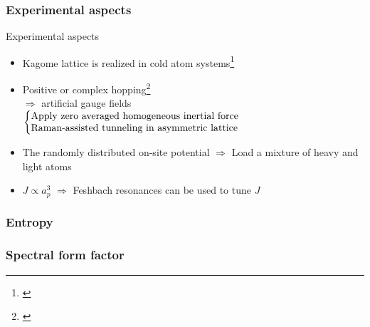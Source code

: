 \subsubsection{Experimental aspects}
\begin{frame}{Experimental aspects}

\begin{itemize}
\item Kagome lattice is realized in cold atom systems\footnote[frame]{\cite{jo2012ultracold}}
\vspace{3 mm}

\item Positive or complex hopping\footnote[frame]{\cite{aidelsburger2011experimental,struck2012tunable}}\\
\vspace{3 mm} $\Rightarrow$ artificial gauge fields
$\left\lbrace\parbox{8cm}{
Apply zero averaged homogeneous inertial force\\
Raman-assisted tunneling in asymmetric lattice
}\right.$
\vspace{8 mm}
\item The randomly distributed on-site potential
$\Rightarrow$ Load a mixture of heavy and light atoms
\vspace{8 mm}
\item $J \propto a_p^{3}$ $\Rightarrow$ Feshbach resonances can be used to tune $J$
\end{itemize}

\end{frame}
\subsubsection{Entropy}
\subsubsection{Spectral form factor}
